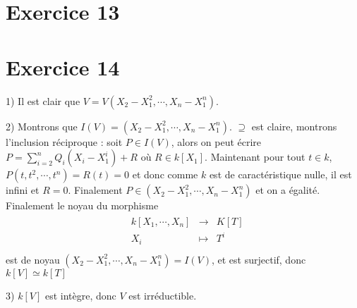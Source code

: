     \section{Exercice 13}

    \section{Exercice 14}
        \begin{question}{1)}
            Il est clair que $V = V(X_2 - X_1^2, \cdots, X_n - X_1^n)$.
        \end{question}
        \begin{question}{2)}
            Montrons que $I(V) = (X_2 - X_1^2, \cdots, X_n - X_1^n)$. $\supseteq$ est claire, montrons l'inclusion réciproque : soit $P \in I(V)$, alors on peut écrire $P = \sum_{i = 2}^n Q_i (X_i - X_1^i) + R$
            où $R \in k[X_1]$. Maintenant pour tout $t \in k$, $P(t, t^2, \cdots, t^n) = R(t) = 0$ et donc comme $k$ est de caractéristique nulle, il est infini et $R = 0$. Finalement $P \in (X_2 - X_1^2, \cdots, X_n - X_1^n)$ et on a égalité. Finalement le noyau du morphisme
            \begin{align*}
                \begin{array}{cccc}
                    & k[X_1, \cdots, X_n] & \to & K[T] \\
                    & X_i & \mapsto & T^i\\
                \end{array}
            \end{align*}
            est de noyau $(X_2 - X_1^2, \cdots, X_n - X_1^n) = I(V)$, et est surjectif, donc $k[V] \simeq k[T]$
        \end{question}
        \begin{question}{3)}
            $k[V]$ est intègre, donc $V$ est irréductible.
        \end{question}

